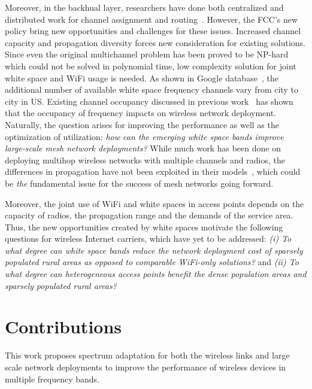 Moreover, in the backhual layer, researchers have done both centralized and 
distributed work for channel assignment and routing~\cite{raniwala2004centralized,wu2006distributed}.
However, the FCC's new policy bring new opportunities
and challenges for these issues.  Increased channel capacity and 
propagation diversity forces new consideration for existing solutions.
Since even the original multichannel problem has been proved to be NP-hard
which could not be solved in polynomial time, low complexity
solution for joint white space and WiFi usage is needed.
As shown in Google database~\cite{googledatabase}, 
the additional number of available white space frequency channels 
vary from city to city in US. Existing channel occupancy discussed in 
previous work~\cite{pcuiwinmee} has shown that the occupancy of 
frequency impacts on wireless network deployment. Naturally, the 
question arises for improving the performance as well as the optimization 
of utilization: {\it how can the emerging white space bands improve 
large-scale mesh network deployments?}  While much work has been done 
on deploying multihop wireless networks with multiple channels and 
radios, the differences in propagation have not been exploited in their 
models~\cite{tang2005interference, long2013fair,doraghinejad2014channel}, 
which could be {\it the} fundamental issue for the success of mesh 
networks going forward.

Moreover, the joint use of WiFi and white spaces  in 
access points depends on the capacity of radios, the propagation range 
and the demands of the service area. 
Thus, the new opportunities created by white spaces motivate the following 
questions for wireless Internet carriers, which have yet to be addressed: 
{\it (i) To what degree can white space bands reduce the network deployment 
cost of sparsely populated rural areas as opposed to comparable WiFi-only 
solutions?} and {\it (ii) To what degree can heterogeneous access points 
benefit the dense population areas and sparsely populated rural areas?}


\section{Contributions}

This work proposes spectrum adaptation for both the wireless links and 
large scale network deployments to improve the performance of wireless devices in 
multiple frequency bands.


